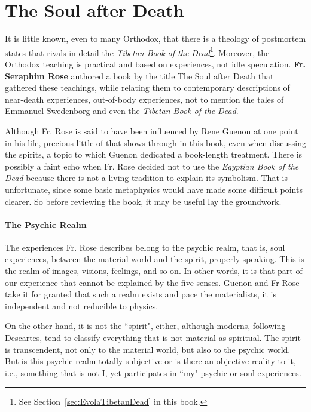 \section{The Soul after Death}

It is little known, even to many Orthodox, that there is a theology of postmortem states that rivals in detail the \textit{Tibetan Book of the Dead}\footnote{See Section~\ref{sec:EvolaTibetanDead} in this book.}. Moreover, the Orthodox teaching is practical and based on experiences, not idle speculation. \textbf{Fr. Seraphim Rose} authored a book by the title The Soul after Death that gathered these teachings, while relating them to contemporary descriptions of near-death experiences, out-of-body experiences, not to mention the tales of Emmanuel Swedenborg and even the \textit{Tibetan Book of the Dead}.

Although Fr. Rose is said to have been influenced by Rene Guenon at one point in his life, precious little of that shows through in this book, even when discussing the spirits, a topic to which Guenon dedicated a book-length treatment. There is possibly a faint echo when Fr. Rose decided not to use the \emph{Egyptian Book of the Dead} because there is not a living tradition to explain its symbolism. That is unfortunate, since some basic metaphysics would have made some difficult points clearer. So before reviewing the book, it may be useful lay the groundwork.

\paragraph{The Psychic Realm}
The experiences Fr. Rose describes belong to the psychic realm, that is, soul experiences, between the material world and the spirit, properly speaking. This is the realm of images, visions, feelings, and so on. In other words, it is that part of our experience that cannot be explained by the five senses. Guenon and Fr Rose take it for granted that such a realm exists and pace the materialists, it is independent and not reducible to physics.

On the other hand, it is not the ``spirit", either, although moderns, following Descartes, tend to classify everything that is not material as spiritual. The spirit is transcendent, not only to the material world, but also to the psychic world. But is this psychic realm totally subjective or is there an objective reality to it, i.e., something that is not-I, yet participates in ``my" psychic or soul experiences.

